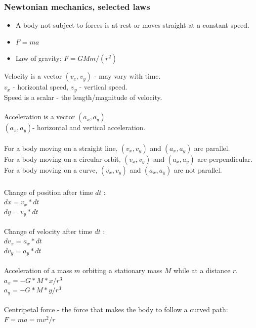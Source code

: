 \documentclass[aspectratio=169,xcolor=pdftex,dvipsnames]{beamer} %
\begin{document}
\begin{frame}
\frametitle{Newtonian mechanics, selected laws}

\begin{itemize}
\item
A body not subject to forces is at rest or moves straight at a constant speed.
\item
$F = ma$
\item
Law of gravity: $F = G Mm / (r^2)$
\end{itemize}

Velocity is a vector $(v_x,v_y)$ - may vary with time.\\
$v_x$ - horizontal speed, $v_y$ - vertical speed.\\
Speed is a scalar - the length/magnitude of velocity.\\
\ \\
Acceleration is a vector $(a_x, a_y)$\\
$(a_x, a_y)$- horizontal and vertical acceleration.\\
\ \\
For a body moving on a straight line, $(v_x,v_y)$ and $(a_x,a_y)$ are parallel.\\
For a body moving on a circular orbit, $(v_x,v_y)$ and $(a_x,a_y)$ are perpendicular.\\
For a body moving on a curve, $(v_x,v_y)$ and $(a_x,a_y)$ are not parallel.

\end{frame}


\begin{frame}
\frametitle{}

Change of position after time $dt$ :\\
$dx = v_x * dt$\\
$dy = v_y * dt$\\
\ \\
Change of velocity after time $dt$ :\\
$dv_x = a_x * dt$\\
$dv_y = a_y * dt$\\
\ \\
Acceleration of a mass $m$ orbiting a stationary mass $M$ while at a distance $r$.\\
$a_x = -G*M*x/r^3$\\
$a_y = -G*M*y/r^3$\\
\ \\
Centripetal force - the force that makes the body to follow a curved path:\\
$F = ma = mv^2/r$

\end{frame}
\end{document}
